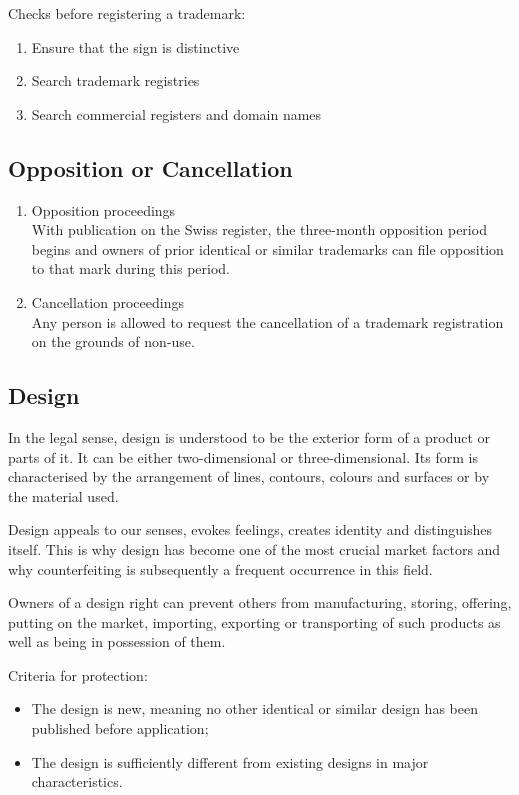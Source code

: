 \documentclass[11pt]{article}
\theoremstyle{definition}
\begin{document}
Checks before registering a trademark:
\begin{enumerate}
	\item Ensure that the sign is distinctive
	\item Search trademark registries
	\item Search commercial registers and domain names
\end{enumerate}

\subsection{Opposition or Cancellation}
\begin{enumerate}
	\item Opposition proceedings\\
	With publication on the Swiss register, the three-month opposition period begins and owners of prior identical or similar trademarks can file opposition to that mark during this period.
	\item Cancellation proceedings\\
	Any person is allowed to request the cancellation of a trademark registration on the grounds of non-use.
\end{enumerate}

\subsection{Design}
In the legal sense, design is understood to be the exterior form of a product or parts of it. It can be either two-dimensional or three-dimensional. Its form is characterised by the arrangement of lines, contours, colours and surfaces or by the material used.

Design appeals to our senses, evokes feelings, creates identity and distinguishes itself. This is why design has become one of the most crucial market factors and why counterfeiting is subsequently a frequent occurrence in this field.

Owners of a design right can prevent others from manufacturing, storing, offering, putting on the market, importing, exporting or transporting of such products as well as  being in possession of them.

Criteria for protection:
\begin{itemize}[label=-,noitemsep]
	\item The design is new, meaning no other identical or similar design has been published before application;
	\item The design is sufficiently different from existing designs in major characteristics.
\end{itemize}
\end{document}
